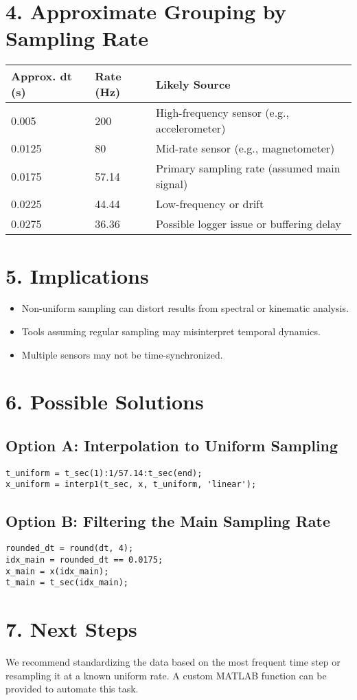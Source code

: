 \documentclass[12pt]{article}
\begin{document}
\section*{4. Approximate Grouping by Sampling Rate}
\begin{center}
\begin{tabular}{@{}lll@{}}
\toprule
\textbf{Approx. dt (s)} & \textbf{Rate (Hz)} & \textbf{Likely Source} \\
\midrule
0.005 & 200     & High-frequency sensor (e.g., accelerometer) \\
0.0125 & 80      & Mid-rate sensor (e.g., magnetometer)        \\
0.0175 & 57.14   & Primary sampling rate (assumed main signal) \\
0.0225 & 44.44   & Low-frequency or drift                      \\
0.0275 & 36.36   & Possible logger issue or buffering delay    \\
\bottomrule
\end{tabular}
\end{center}

\section*{5. Implications}
\begin{itemize}
  \item Non-uniform sampling can distort results from spectral or kinematic analysis.
  \item Tools assuming regular sampling may misinterpret temporal dynamics.
  \item Multiple sensors may not be time-synchronized.
\end{itemize}

\section*{6. Possible Solutions}
\subsection*{Option A: Interpolation to Uniform Sampling}
\begin{verbatim}
t_uniform = t_sec(1):1/57.14:t_sec(end);
x_uniform = interp1(t_sec, x, t_uniform, 'linear');
\end{verbatim}

\subsection*{Option B: Filtering the Main Sampling Rate}
\begin{verbatim}
rounded_dt = round(dt, 4);
idx_main = rounded_dt == 0.0175;
x_main = x(idx_main);
t_main = t_sec(idx_main);
\end{verbatim}

\section*{7. Next Steps}
We recommend standardizing the data based on the most frequent time step or resampling it at a known uniform rate. A custom MATLAB function can be provided to automate this task.
\end{document}
